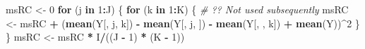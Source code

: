 \documentclass[
]{book}
\newenvironment{Shaded}{\begin{snugshade}}{\end{snugshade}}
\newcommand{\CommentTok}[1]{\textcolor[rgb]{0.56,0.35,0.01}{\textit{#1}}}
\newcommand{\ControlFlowTok}[1]{\textcolor[rgb]{0.13,0.29,0.53}{\textbf{#1}}}
\newcommand{\DecValTok}[1]{\textcolor[rgb]{0.00,0.00,0.81}{#1}}
\newcommand{\KeywordTok}[1]{\textcolor[rgb]{0.13,0.29,0.53}{\textbf{#1}}}
\newcommand{\NormalTok}[1]{#1}
\newcommand{\OperatorTok}[1]{\textcolor[rgb]{0.81,0.36,0.00}{\textbf{#1}}}
\newcommand{\StringTok}[1]{\textcolor[rgb]{0.31,0.60,0.02}{#1}}
\begin{document}
\begin{Shaded}
\begin{Highlighting}[]
\NormalTok{msRC \textless{}{-}}\StringTok{ }\DecValTok{0}
\ControlFlowTok{for}\NormalTok{ (j }\ControlFlowTok{in} \DecValTok{1}\OperatorTok{:}\NormalTok{J) \{}
  \ControlFlowTok{for}\NormalTok{ (k }\ControlFlowTok{in} \DecValTok{1}\OperatorTok{:}\NormalTok{K) \{ }\CommentTok{\# ?? Not used subsequently}
\NormalTok{    msRC \textless{}{-}}\StringTok{ }\NormalTok{msRC }\OperatorTok{+}\StringTok{ }\NormalTok{(}\KeywordTok{mean}\NormalTok{(Y[, j, k]) }\OperatorTok{{-}}\StringTok{ }\KeywordTok{mean}\NormalTok{(Y[, j, ]) }\OperatorTok{{-}}\StringTok{ }\KeywordTok{mean}\NormalTok{(Y[, , k]) }\OperatorTok{+}\StringTok{ }\KeywordTok{mean}\NormalTok{(Y))}\OperatorTok{\^{}}\DecValTok{2}
\NormalTok{  \}}
\NormalTok{\}}
\NormalTok{msRC \textless{}{-}}\StringTok{ }\NormalTok{msRC }\OperatorTok{*}\StringTok{ }\NormalTok{I}\OperatorTok{/}\NormalTok{((J }\OperatorTok{{-}}\StringTok{ }\DecValTok{1}\NormalTok{) }\OperatorTok{*}\StringTok{ }\NormalTok{(K }\OperatorTok{{-}}\StringTok{ }\DecValTok{1}\NormalTok{))}


\end{Highlighting}
\end{Shaded}
\end{document}
